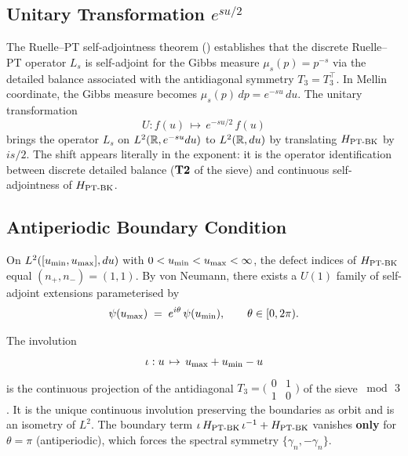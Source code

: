 \subsection{Unitary Transformation $e^{su/2}$}
\label{sec:transformation_unitaire}

The Ruelle--PT self-adjointness theorem (\cite{PT_Foundations})
establishes that the discrete Ruelle--PT operator $L_s$ is self-adjoint for
the Gibbs measure $\mu_s(p) = p^{-s}$ via the detailed balance associated
with the antidiagonal symmetry $T_3 = T_3^{\top}$. In Mellin coordinate,
the Gibbs measure becomes $\mu_s(p)\,dp = e^{-su}\,du$. The unitary
transformation
\begin{equation}
U : f(u) \,\mapsto\, e^{-su/2}\,f(u)
\label{eq:U_unitaire}
\end{equation}
brings the operator $L_s$ on $L^{2}(\mathbb{R}, e^{-su} du)$ to
$L^{2}(\mathbb{R}, du)$ by translating $H_{\mathrm{PT\text{-}BK}}$ by $is/2$. The shift appears
literally in the exponent: it is the operator identification
between discrete detailed balance ($\textbf{T2}$ of the sieve) and continuous
self-adjointness of $H_{\mathrm{PT\text{-}BK}}$.

\subsection{Antiperiodic Boundary Condition}
\label{sec:bord_antiperiodique}

On $L^{2}([u_{\min}, u_{\max}], du)$ with $0 < u_{\min} < u_{\max} < \infty$, the
defect indices of $H_{\mathrm{PT\text{-}BK}}$ equal $(n_+, n_-) = (1, 1)$. By von
Neumann, there exists a $U(1)$ family of self-adjoint extensions
parameterised by
\begin{equation}
\psi(u_{\max}) \;=\; e^{i\theta}\,\psi(u_{\min}), \qquad \theta \in [0, 2\pi).
\label{eq:BC_general}
\end{equation}

\begin{proposition}[PT-canonical selection: antiperiodicity $\theta = \pi$]
\label{prop:antiperiodicite}
The involution
\[
\iota : u \,\mapsto\, u_{\max} + u_{\min} - u
\]
is the continuous projection of the antidiagonal
$T_3 = \bigl(\begin{smallmatrix}0 & 1\\ 1 & 0\end{smallmatrix}\bigr)$ of
the sieve $\bmod\,3$. It is the unique continuous involution preserving the
boundaries as orbit and is an isometry of $L^{2}$. The boundary term
$\iota\,H_{\mathrm{PT\text{-}BK}}\,\iota^{-1} + H_{\mathrm{PT\text{-}BK}}$ vanishes \textbf{only} for
$\theta = \pi$ (antiperiodic), which forces the spectral symmetry
$\{\gamma_n, -\gamma_n\}$.
\end{proposition}


